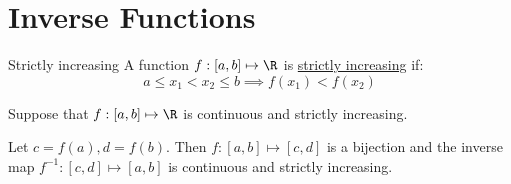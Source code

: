 \documentclass[../Main.tex]{subfiles}
\begin{document}
\section{Inverse Functions}
\begin{definition}{Strictly increasing}
    A function $f : [a, b] \mapsto \R$ is \underline{strictly increasing} if:
    \begin{equation*}
        a \leq x_1 < x_2 \leq b \implies f(x_1) < f(x_2)
    \end{equation*}
\end{definition}
\begin{theorem}
    Suppose that $f : [a, b] \mapsto \R$ is continuous and strictly increasing.\par
    Let $c = f(a), d = f(b)$. Then $f : [a, b] \mapsto [c, d]$ is a bijection and the inverse map $f^{-1} : [c, d] \mapsto [a, b]$ is continuous and strictly increasing.
\end{theorem}
\end{document}
